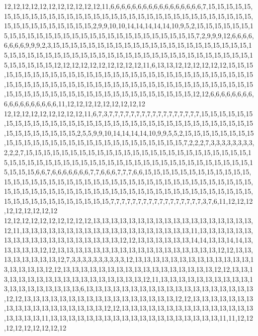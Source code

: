 12,12,12,12,12,12,12,12,12,12,12,11,6,6,6,6,6,6,6,6,6,6,6,6,6,6,6,6,6,7,15,15,15,15,15,15,15,15,15,15,15,15,15,15,15,15,15,15,15,15,15,15,15,15,15,15,15,15,15,15,15,15,15,15,15,15,15,15,15,15,15,15,15,2,9,9,10,10,14,14,14,14,14,10,9,5,2,15,15,15,15,15,15,15,15,15,15,15,15,15,15,15,15,15,15,15,15,15,15,15,15,15,15,15,15,7,2,9,9,9,12,6,6,6,6,6,6,6,6,9,9,9,2,3,15,15,15,15,15,15,15,15,15,15,15,15,15,15,15,15,15,15,15,15,15,15,15,15,15,15,15,15,15,15,15,15,15,15,15,15,15,15,15,15,15,15,15,15,15,15,15,15,15,15,15,15,15,15,15,15,12,12,12,12,12,12,12,12,12,12,11,6,13,13,12,12,12,12,12,12,15,15,15,15,15,15,15,15,15,15,15,15,15,15,15,15,15,15,15,15,15,15,15,15,15,15,15,15,15,15,15,15,15,15,15,15,15,15,15,15,15,15,15,15,15,15,15,15,15,15,15,15,15,15,15,15,15,15,15,15,15,15,15,15,15,15,15,15,15,15,15,15,15,15,15,15,15,15,15,15,12,12,6,6,6,6,6,6,6,6,6,6,6,6,6,6,6,6,6,6,11,12,12,12,12,12,12,12,12,12
12,12,12,12,12,12,12,12,12,11,6,7,3,7,7,7,7,7,7,7,7,7,7,7,7,7,7,7,7,7,15,15,15,15,15,15,15,15,15,15,15,15,15,15,15,15,15,15,15,15,15,15,15,15,15,15,15,15,15,15,15,15,15,15,15,15,15,15,15,15,15,15,2,5,5,9,9,10,14,14,14,14,10,9,9,5,5,2,15,15,15,15,15,15,15,15,15,15,15,15,15,15,15,15,15,15,15,15,15,15,15,15,15,15,15,15,7,2,2,2,7,3,3,3,3,3,3,3,3,2,2,2,7,15,15,15,15,15,15,15,15,15,15,15,15,15,15,15,15,15,15,15,15,15,15,15,15,15,15,15,15,15,15,15,15,15,15,15,15,15,15,15,15,15,15,15,15,15,15,15,15,15,15,15,15,15,15,15,15,15,6,6,7,6,6,6,6,6,6,6,7,7,6,6,6,7,7,7,6,6,15,15,15,15,15,15,15,15,15,15,15,15,15,15,15,15,15,15,15,15,15,15,15,15,15,15,15,15,15,15,15,15,15,15,15,15,15,15,15,15,15,15,15,15,15,15,15,15,15,15,15,15,15,15,15,15,15,15,15,15,15,15,15,15,15,15,15,15,15,15,15,15,15,15,15,15,15,15,15,15,7,7,7,7,7,7,7,7,7,7,7,7,7,7,7,7,7,3,7,6,11,12,12,12,12,12,12,12,12,12
12,12,12,12,12,12,12,12,12,12,13,13,13,13,13,13,13,13,13,13,13,13,13,13,13,13,13,13,12,11,13,13,13,13,13,13,13,13,13,13,13,13,13,13,13,13,13,13,13,11,13,13,13,13,13,13,13,13,13,13,13,13,13,13,13,13,13,13,13,12,12,13,13,13,13,13,13,14,14,13,13,14,14,13,13,13,13,13,12,12,13,13,13,13,13,13,13,13,13,13,13,13,13,13,13,13,13,13,12,12,13,13,13,13,13,13,13,13,12,7,3,3,3,3,3,3,3,3,3,3,12,13,13,13,13,13,13,13,13,13,13,13,13,13,13,13,13,13,13,12,12,13,13,13,13,13,13,13,13,13,13,13,13,13,13,13,13,13,12,12,13,13,13,13,13,13,13,13,13,13,13,13,13,13,13,13,13,13,12,11,13,13,13,13,13,13,13,13,13,13,13,13,13,13,13,13,13,13,13,6,13,13,13,13,13,13,13,13,13,13,13,13,13,13,13,13,13,13,13,12,12,13,13,13,13,13,13,13,13,13,13,13,13,13,13,13,13,13,12,12,13,13,13,13,13,13,13,13,13,13,13,13,13,13,13,13,13,13,12,12,13,13,13,13,13,13,13,13,13,13,13,13,13,13,13,13,13,13,13,11,13,13,13,13,13,13,13,13,13,13,13,13,13,13,13,13,13,13,13,11,11,12,12,12,12,12,12,12,12,12
